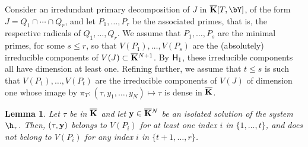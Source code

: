 \documentclass[12pt]{article}
\newtheorem{lemma}[definition]{Lemma}
\begin{document}
\medskip

Consider an irredundant primary decomposition of $J$ in
$\KKbar[T,\bY]$, of the form $J=Q_1 \cap \cdots
\cap Q_r$, and let $P_1,\dots,P_r$ be the associated primes, that is,
the respective radicals of $Q_1,\dots,Q_r$. We assume that
$P_1,\dots,P_s$ are the minimal primes, for some $s \le r$, so that
$V(P_1),\dots,V(P_s)$ are the (absolutely) irreducible components of
$V(J)\subset \overline{\mathbf{K}}{}^{N+1}$. By ${\sf H}_1$, these irreducible
components all have dimension at least one. Refining further, we
assume that $t \le s$ is such that $V(P_1),\dots,V(P_t)$ are the
 irreducible components of $V(J)$ of dimension one whose
image by $\pi_T: (\tau,y_1,\dots,y_N) \mapsto \tau$ is dense in
$\overline{\mathbf{K}}$.

\begin{lemma}\label{lemma:vPi}
  Let $\tau$ be in $\overline{\mathbf{K}}$ and let $\mathbf{y} \in \overline{\mathbf{K}}{}^N$ be an isolated
  solution of the system $\h_\tau$. Then, $(\tau,\mathbf{y})$ belongs to $V(P_i)$
  for at least one index $i$ in $\{1,\dots,t\}$, and does not belong
  to $V(P_i)$ for any index $i$ in $\{t+1,\dots,r\}$.
\end{lemma}
\end{document}
